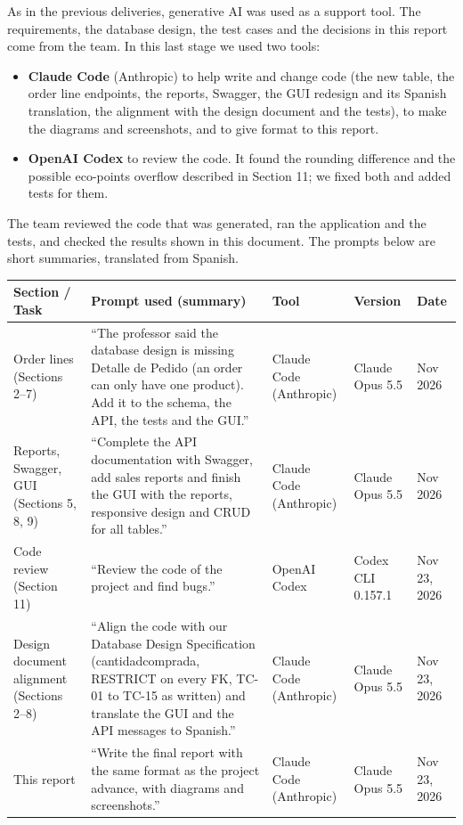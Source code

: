 \documentclass[11pt]{article}
\renewcommand{\_}{\oldus\allowbreak}
\begin{document}
As in the previous deliveries, generative AI was used as a support tool. The requirements, the
database design, the test cases and the decisions in this report come from the team. In this last
stage we used two tools:

\begin{itemize}[itemsep=0.1em]
  \item \textbf{Claude Code} (Anthropic) to help write and change code (the new table, the order
  line endpoints, the reports, Swagger, the GUI redesign and its Spanish translation, the alignment
  with the design document and the tests), to make the diagrams and screenshots, and to give format
  to this report.
  \item \textbf{OpenAI Codex} to review the code. It found the rounding difference and the possible
  eco-points overflow described in Section 11; we fixed both and added tests for them.
\end{itemize}

The team reviewed the code that was generated, ran the application and the tests, and checked the
results shown in this document. The prompts below are short summaries, translated from Spanish.

\begin{center}
\small
\begin{tabular}{>{\raggedright}p{2.8cm} >{\raggedright}p{6.2cm} >{\raggedright}p{1.9cm} >{\raggedright}p{1.6cm} >{\raggedright\arraybackslash}p{1.8cm}}
\toprule
\textbf{Section / Task} & \textbf{Prompt used (summary)} & \textbf{Tool} & \textbf{Version} & \textbf{Date} \\
\midrule
Order lines (Sections 2--7) & ``The professor said the database design is missing Detalle de Pedido (an order can only have one product). Add it to the schema, the API, the tests and the GUI.'' & Claude Code (Anthropic) & Claude Opus 5.5 & Nov 2026 \\
Reports, Swagger, GUI (Sections 5, 8, 9) & ``Complete the API documentation with Swagger, add sales reports and finish the GUI with the reports, responsive design and CRUD for all tables.'' & Claude Code (Anthropic) & Claude Opus 5.5 & Nov 2026 \\
Code review (Section 11) & ``Review the code of the project and find bugs.'' & OpenAI Codex & Codex CLI 0.157.1 & Nov 23, 2026 \\
Design document alignment (Sections 2--8) & ``Align the code with our Database Design Specification (cantidad\_comprada, RESTRICT on every FK, TC-01 to TC-15 as written) and translate the GUI and the API messages to Spanish.'' & Claude Code (Anthropic) & Claude Opus 5.5 & Nov 23, 2026 \\
This report & ``Write the final report with the same format as the project advance, with diagrams and screenshots.'' & Claude Code (Anthropic) & Claude Opus 5.5 & Nov 23, 2026 \\
\bottomrule
\end{tabular}
\end{center}
\end{document}
